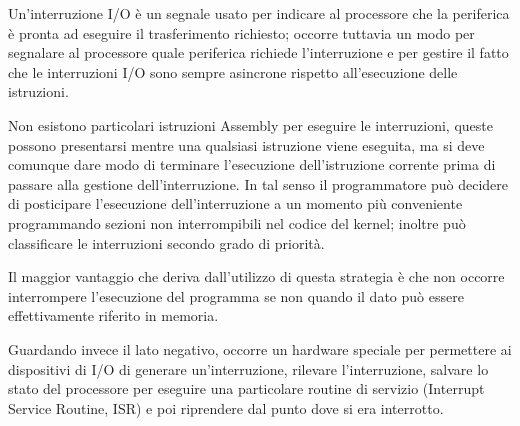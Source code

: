 \documentclass[class=book, crop=false, oneside]{standalone}
\begin{document}
Un'interruzione I/O è un segnale usato per indicare al processore che la periferica è pronta ad eseguire il trasferimento richiesto;
occorre tuttavia un modo per segnalare al processore quale periferica richiede l'interruzione e per gestire il fatto che le interruzioni I/O sono sempre asincrone rispetto all'esecuzione delle istruzioni.

Non esistono particolari istruzioni Assembly per eseguire le interruzioni, queste possono presentarsi mentre una qualsiasi istruzione viene eseguita, ma si deve comunque dare modo di terminare l'esecuzione dell'istruzione corrente prima di passare alla gestione dell'interruzione. In tal senso il programmatore può decidere di posticipare l'esecuzione dell'interruzione a un momento più conveniente programmando sezioni non interrompibili nel codice del kernel; inoltre può classificare le interruzioni secondo grado di priorità.

Il maggior vantaggio che deriva dall'utilizzo di questa strategia è che non occorre interrompere l'esecuzione del programma se non quando il dato può essere effettivamente riferito in memoria.

Guardando invece il lato negativo, occorre un hardware speciale per permettere ai dispositivi di I/O di generare un'interruzione, rilevare l'interruzione, salvare lo stato del processore per eseguire una particolare routine di servizio (Interrupt Service Routine, ISR) e poi riprendere dal punto dove si era interrotto.
\end{document}

